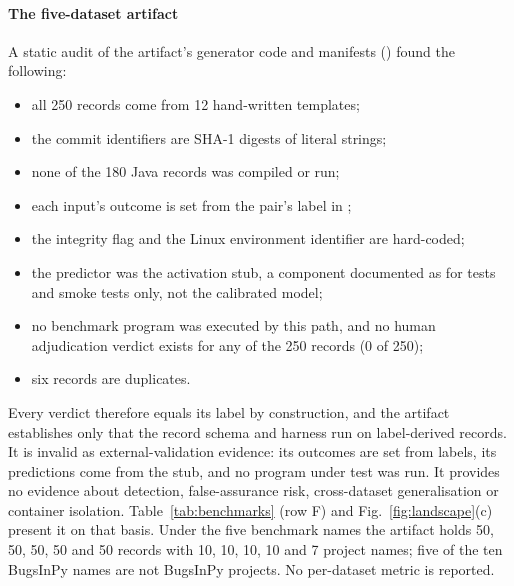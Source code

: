 \paragraph*{The five-dataset artifact} A static audit of the artifact's generator code and manifests () found the following:
\begin{itemize}
\item all 250 records come from 12 hand-written templates;
\item the commit identifiers are SHA-1 digests of literal strings;
\item none of the 180 Java records was compiled or run;
\item each input's outcome is set from the pair's label in ;
\item the integrity flag and the Linux environment identifier are hard-coded;
\item the predictor was the activation stub, a component documented as for tests and smoke tests only, not the calibrated model;
\item no benchmark program was executed by this path, and no human adjudication verdict exists for any of the 250 records (0 of 250);
\item six records are duplicates.
\end{itemize}
Every verdict therefore equals its label by construction, and the artifact establishes only that the record schema and harness run on label-derived records. It is invalid as external-validation evidence: its outcomes are set from labels, its predictions come from the stub, and no program under test was run. It provides no evidence about detection, false-assurance risk, cross-dataset generalisation or container isolation. Table~\ref{tab:benchmarks} (row F) and Fig.~\ref{fig:landscape}(c) present it on that basis. Under the five benchmark names the artifact holds 50, 50, 50, 50 and 50 records with 10, 10, 10, 10 and 7 project names; five of the ten BugsInPy names are not BugsInPy projects. No per-dataset metric is reported.

